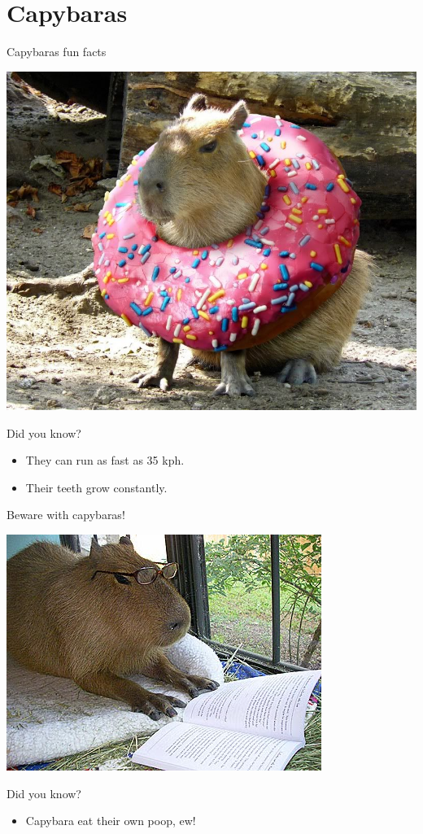 \documentclass[11pt]{beamer}
\begin{document}
\section{Capybaras}
\begin{frame}{Capybaras fun facts}
	\begin{center}
		\includegraphics[width = .50\textwidth]{capydonut.jpg}
	\end{center}
	\begin{block} {Did you know?}
		\begin{itemize}
			\item They can run as fast as 35 kph.
			\item Their teeth grow constantly.
		\end{itemize}
	\end{block}
\end{frame}

\begin{frame}{Beware with capybaras!}
	\begin{center}
		\includegraphics[width = .60\textwidth]{studybara.jpg}
	\end{center}
	\begin{alertblock} {Did you know?}
		\begin{itemize}
			\pause
			\item Capybara eat their own poop, ew!
		\end{itemize}
	\end{alertblock}
\end{frame}
\end{document}
